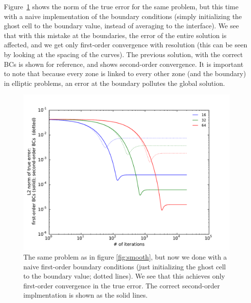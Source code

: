 Figure~\ref{fig:smooth-badbcs} shows the norm of the true error for
the same problem, but this time with a naive implementation of the 
boundary conditions (simply initializing the ghost cell to the boundary
value, instead of averaging to the interface).  We see that with this
mistake at the boundaries, the error of the entire solution is 
affected, and we get only first-order convergence with resolution
(this can be seen by looking at the spacing of the curves).  The previous
solution, with the correct BCs is shown for reference, and shows 
second-order convergence.  It is important to note that because every
zone is linked to every other zone (and the boundary) in elliptic
problems, an error at the boundary pollutes the global solution.

\begin{figure}
\centering
\includegraphics[width=\linewidth]{smooth-badBCs}
\caption[Convergence of smoothing in first-order BCs]{\label{fig:smooth-badbcs} 
  The same problem as in figure \ref{fig:smooth}, but
  now we done with a naive first-order boundary conditions (just initializing
  the ghost cell to the boundary value; dotted lines).  We see that this 
  achieves only first-order convergence in the true error.  The correct
  second-order implmentation is shown as the solid lines.
  \\ }
\end{figure}


